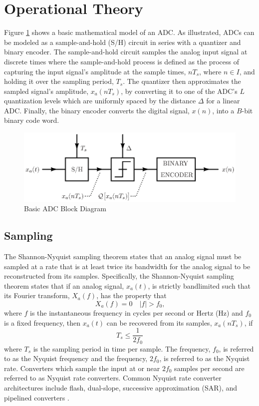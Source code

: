 \section{Operational Theory}
Figure \ref{fig:basic_adc} shows a basic mathematical model of an ADC. As illustrated,
ADCs can be modeled as a sample-and-hold (S/H) circuit in series with a quantizer and
binary encoder. The sample-and-hold circuit samples the analog input signal at discrete
times where the sample-and-hold process is defined as the process of capturing  the
input signal's amplitude at the sample times, $n T_s$, where $n\in I$, and holding it over
the sampling period, $T_s$. The quantizer then approximates the sampled signal's
amplitude, $x_a(n T_s)$, by converting it to one of the ADC's $L$ quantization levels
which are uniformly spaced by the distance $\Delta$ for a linear ADC. Finally, the
binary encoder converts the digital signal, $x(n)$, into a $B$-bit binary code word.
\begin{figure}[htbp]
 \centering
 \includegraphics{./final_figures/basic_ADC.eps}
 \caption{Basic ADC Block Diagram}
 \label{fig:basic_adc}
\end{figure}

\subsection{Sampling}
The Shannon-Nyquist sampling theorem states that an analog signal must be sampled at a
rate that is at least twice its bandwidth for the analog signal to be reconstructed from
its samples. Specifically, the Shannon-Nyquist sampling theorem states that if an analog
signal, $x_{a}(t)$, is strictly bandlimited such that its Fourier transform, $X_a(f)$, has
the property that $$X_{a}(f) = 0 \quad\lvert f\lvert > f_{0}\text{,}$$ where $f$ is the
instantaneous frequency in cycles per second or Hertz (Hz) and $f_0$ is a fixed frequency,
then $x_a(t)$ can be recovered from its samples, $x_a(n T_s)$, if 
\begin{equation}\label{eq:nyquist}
 T_s\leq\frac{1}{2f_{0}}
\end{equation}
where $T_s$ is the sampling period in time per sample. The frequency, $f_0$, is referred
to as the Nyquist frequency and the frequency, $2f_{0}$, is referred to as the Nyquist
rate. Converters which sample the input at or near $2f_0$ samples per second  are referred
to as Nyquist rate converters. Common Nyquist rate converter architectures include flash,
dual-slope, successive approximation (SAR), and pipelined converters
\cite{wikipedia_contributors_analog-to-digital_2007}.


